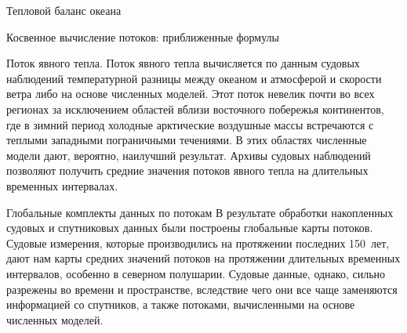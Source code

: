 \begin{chapter}{Тепловой баланс океана}
\begin{section}{Косвенное вычисление потоков: приближенные формулы}
\begin{paragraph}{Поток явного тепла.}
Поток явного тепла вычисляется по данным судовых наблюдений температурной
разницы между океаном и атмосферой и скорости ветра либо на основе численных
моделей. Этот поток невелик почти во всех регионах за исключением областей
вблизи восточного побережья континентов, где в зимний период холодные 
арктические воздушные массы встречаются с теплыми западными пограничными
течениями. В этих областях численные модели дают, вероятно, наилучший 
результат. Архивы судовых наблюдений позволяют получить средние значения 
потоков явного тепла на длительных временных интервалах.
%
\end{paragraph}
\end{section}


\begin{section}{Глобальные комплекты данных по потокам}\label{sec:FluxDataSets}
В результате обработки накопленных судовых и спутниковых данных были построены
глобальные карты потоков. Судовые измерения, которые производились на 
протяжении последних 150~лет, дают нам карты средних значений потоков 
на протяжении длительных временных интервалов, особенно в северном полушарии.
Судовые данные, однако, сильно разрежены во времени и пространстве, вследствие
чего они все чаще заменяются информацией со спутников, а также потоками, 
вычисленными на основе численных моделей.
%


\end{section}
\end{chapter}
